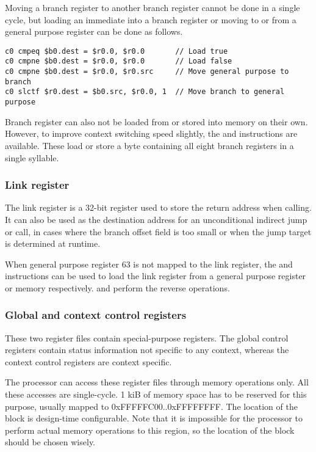 Moving a branch register to another branch register cannot be done in a single
cycle, but loading an immediate into a branch register or moving to or from a
general purpose register can be done as follows.

\begin{lstlisting}[numbers=none, basicstyle=\footnotesize, language=vexasm]
c0 cmpeq $b0.dest = $r0.0, $r0.0       // Load true
c0 cmpne $b0.dest = $r0.0, $r0.0       // Load false
c0 cmpne $b0.dest = $r0.0, $r0.src     // Move general purpose to branch
c0 slctf $r0.dest = $b0.src, $r0.0, 1  // Move branch to general purpose
\end{lstlisting}

Branch register can also not be loaded from or stored into memory on their own.
However, to improve context switching speed slightly, the  and
 instructions are available. These load or store a byte containing
all eight branch registers in a single syllable.

\subsubsection{Link register}
\label{sec:core-ug-isa-regs-lr}

The link register is a 32-bit register used to store the return address when
calling. It can also be used as the destination address for an unconditional
indirect jump or call, in cases where the branch offset field is too small or
when the jump target is determined at runtime.

When general purpose register 63 is not mapped to the link register, the 
 and  instructions can be used to load the link register 
from a general purpose register or memory respectively.  and 
 perform the reverse operations.

\subsubsection{Global and context control registers}
\label{sec:core-ug-isa-regs-creg}

These two register files contain special-purpose registers. The global control
registers contain status information not specific to any context, whereas the
context control registers are context specific.

The processor can access these register files through memory operations only. 
All these accesses are single-cycle. 1 kiB of memory space has to be reserved 
for this purpose, usually mapped to 0xFFFFFC00..0xFFFFFFFF. The location of the 
block is design-time configurable. Note that it is impossible for the processor 
to perform actual memory operations to this region, so the location of the block 
should be chosen wisely.


